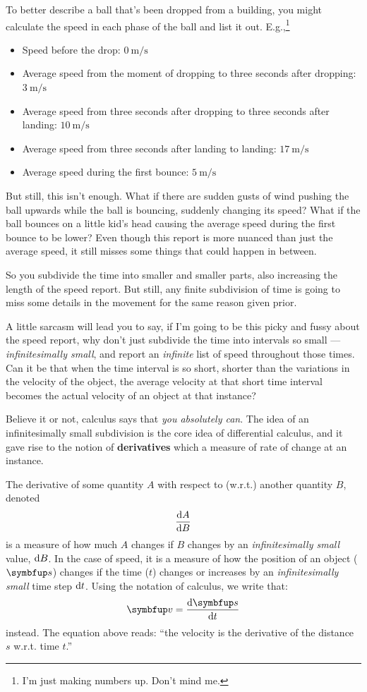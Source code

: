 To better describe a ball that's been dropped from a building, you might calculate the speed in each phase of the ball and list it out. E.g.,\footnote{I'm just making numbers up. Don't mind me.}
\begin{itemize}
  \item Speed before the drop: \(\qty{0}{\meter\per\second}\)
  \item Average speed from the moment of dropping to three seconds after dropping: \(\qty{3}{\meter\per\second}\)
  \item Average speed from three seconds after dropping to three seconds after landing: \(\qty{10}{\meter\per\second}\)
  \item Average speed from three seconds after landing to landing: \(\qty{17}{\meter\per\second}\)
  \item Average speed during the first bounce: \(\qty{5}{\meter\per\second}\)
\end{itemize}
But still, this isn't enough. What if there are sudden gusts of wind pushing the ball upwards while the ball is bouncing, suddenly changing its speed? What if the ball bounces on a little kid's head causing the average speed during the first bounce to be lower? Even though this report is more nuanced than just the average speed, it still misses some things that could happen in between.

So you subdivide the time into smaller and smaller parts, also increasing the length of the speed report. But still, any finite subdivision of time is going to miss some details in the movement for the same reason given prior.

A little sarcasm will lead you to say, if I'm going to be this picky and fussy about the speed report, why don't just subdivide the time into intervals so small --- \emph{infinitesimally small}, and report an \emph{infinite} list of speed throughout those times. Can it be that when the time interval is so short, shorter than the variations in the velocity of the object, the average velocity at that short time interval becomes the actual velocity of an object at that instance?

Believe it or not, calculus says that \emph{you absolutely can}. The idea of an infinitesimally small subdivision is the core idea of differential calculus, and it gave rise to the notion of \textbf{derivatives} which a measure of rate of change at an instance.

The derivative of some quantity \(A\) with respect to (w.r.t.) another quantity \(B\), denoted
\begin{equation}
  \odv{A}{B}
\end{equation}
is a measure of how much \(A\) changes if \(B\) changes by an \emph{infinitesimally small} value, \(\odif{B}\). In the case of speed, it is a measure of how the position of an object (\(\vv{s}\)) changes if the time (\(t\)) changes or increases by an \emph{infinitesimally small} time step \(\odif{t}\). Using the notation of calculus, we write that:
\begin{equation}
  \vv{v} = \odv{\vv{s}}{t}
\end{equation}
instead. The equation above reads: \enquote{the velocity is the derivative of the distance \(s\) w.r.t. time \(t\).}

